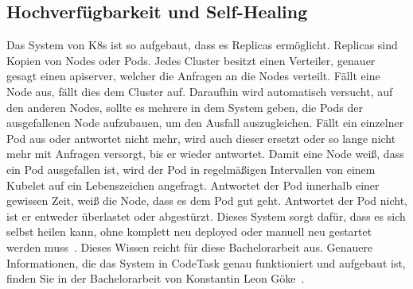\subsection{Hochverfügbarkeit und Self-Healing}
Das System von K8s ist so aufgebaut, dass es Replicas ermöglicht. Replicas sind Kopien von Nodes oder Pods. Jedes Cluster besitzt einen Verteiler, genauer gesagt einen apiserver, welcher die Anfragen an die Nodes verteilt. Fällt eine Node aus, fällt dies dem Cluster auf. Daraufhin wird automatisch versucht, auf den anderen Nodes, sollte es mehrere in dem System geben, die Pods der ausgefallenen Node aufzubauen, um den Ausfall auszugleichen. Fällt ein einzelner Pod aus oder antwortet nicht mehr, wird auch dieser ersetzt oder so lange nicht mehr mit Anfragen versorgt, bis er wieder antwortet. Damit eine Node weiß, dass ein Pod ausgefallen ist, wird der Pod in regelmäßigen Intervallen von einem Kubelet auf ein Lebenszeichen angefragt. Antwortet der Pod innerhalb einer gewissen Zeit, weiß die Node, dass es dem Pod gut geht. Antwortet der Pod nicht, ist er entweder überlastet oder abgestürzt. Dieses System sorgt dafür, dass es sich selbst heilen kann, ohne komplett neu deployed oder manuell neu gestartet werden muss~\cite{k8sCluster}. Dieses Wissen reicht für diese Bachelorarbeit aus. Genauere Informationen, die das System in CodeTask genau funktioniert und aufgebaut ist, finden Sie in der Bachelorarbeit von Konstantin Leon Göke~\cite{baKonstantin}.
